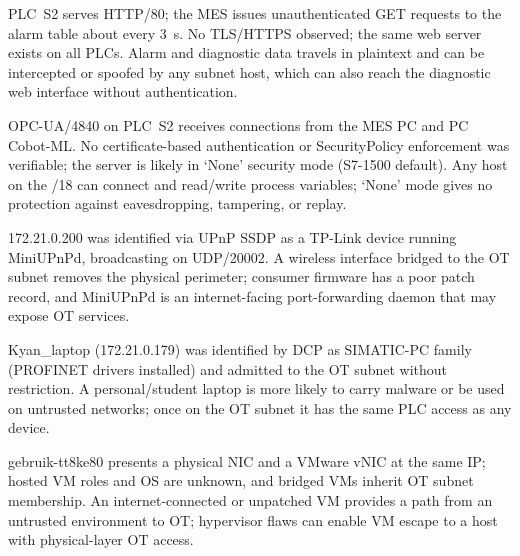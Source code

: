 \documentclass[11pt,a4paper]{article}
\begin{document}
{PLC~S2 serves HTTP/80; the MES issues unauthenticated GET requests to the alarm table about every 3~s. No TLS/HTTPS observed; the same web server exists on all PLCs.}
{Alarm and diagnostic data travels in plaintext and can be intercepted or spoofed by any subnet host, which can also reach the diagnostic web interface without authentication.}

{OPC-UA/4840 on PLC~S2 receives connections from the MES PC and PC Cobot-ML. No certificate-based authentication or SecurityPolicy enforcement was verifiable; the server is likely in `None' security mode (S7-1500 default).}
{Any host on the /18 can connect and read/write process variables; `None' mode gives no protection against eavesdropping, tampering, or replay.}

{172.21.0.200 was identified via UPnP SSDP as a TP-Link device running MiniUPnPd, broadcasting on UDP/20002.}
{A wireless interface bridged to the OT subnet removes the physical perimeter; consumer firmware has a poor patch record, and MiniUPnPd is an internet-facing port-forwarding daemon that may expose OT services.}

{Kyan\_laptop (172.21.0.179) was identified by DCP as SIMATIC-PC family (PROFINET drivers installed) and admitted to the OT subnet without restriction.}
{A personal/student laptop is more likely to carry malware or be used on untrusted networks; once on the OT subnet it has the same PLC access as any device.}

{gebruik-tt8ke80 presents a physical NIC and a VMware vNIC at the same IP; hosted VM roles and OS are unknown, and bridged VMs inherit OT subnet membership.}
{An internet-connected or unpatched VM provides a path from an untrusted environment to OT; hypervisor flaws can enable VM escape to a host with physical-layer OT access.}
\end{document}
